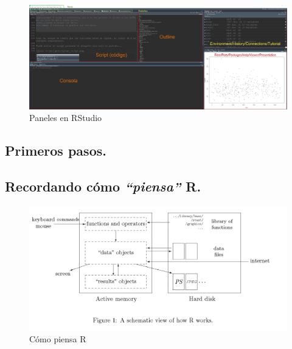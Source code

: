 \documentclass[
  letterpaper,
  DIV=11,
  numbers=noendperiod]{scrreprt}
\begin{document}
\begin{figure}

{\centering \includegraphics[width=2\textwidth,height=\textheight]{./pics/panelesRstudio.png}

}

\caption{Paneles en RStudio}

\end{figure}

\hypertarget{primeros-pasos.}{%
\subsection{Primeros pasos.}\label{primeros-pasos.}}

\hypertarget{recordando-cuxf3mo-piensa-r.}{%
\subsection{\texorpdfstring{Recordando cómo \emph{``piensa''}
R.}{Recordando cómo ``piensa'' R.}}\label{recordando-cuxf3mo-piensa-r.}}

\begin{figure}

{\centering \includegraphics{./pics/como_piensa_R.png}

}

\caption{Cómo piensa R}

\end{figure}
\end{document}
